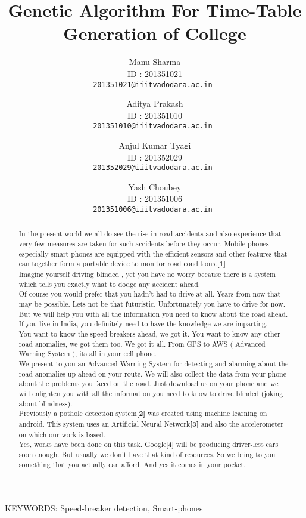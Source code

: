 \documentclass[12pt,twocolumn]{article}
\begin{document}
\title{ Genetic Algorithm For Time-Table Generation of College }

\author{Manu Sharma\\
ID : 201351021\\
{\tt\small 201351021@iiitvadodara.ac.in }
\and
Aditya Prakash\\
ID : 201351010\\
{\tt\small 201351010@iiitvadodara.ac.in }
\and
Anjul Kumar Tyagi\\
ID : 201352029\\
{\tt\small 201352029@iiitvadodara.ac.in }
\and
Yash Choubey\\
ID : 201351006\\
{\tt\small 201351006@iiitvadodara.ac.in }
}
\maketitle
\begin{abstract}
In the present world we all do see the rise in road accidents and also experience that very few measures are taken for such accidents before they occur. Mobile phones especially smart phones are equipped with the efficient sensors and other features that can together form a portable device to monitor road conditions.\textbf{[1]}\\
Imagine yourself driving blinded , yet you have no worry because there is a system which tells you exactly what to dodge any accident ahead.\\
Of course you would prefer that you hadn't had to drive at all. Years from now that may be possible. Lets not be that futuristic. Unfortunately you have to drive for now. But we will help you with all the information you need to know about the road ahead. If you live in India, you definitely need to have the knowledge we are imparting.\\
You want to know the speed breakers ahead, we got it. You want to know any other road anomalies, we got them too. We got it all. From GPS to AWS ( Advanced Warning System ), its all in your cell phone.\\
We present to you an Advanced Warning System for detecting and alarming about the road anomalies up ahead on your route. We will also collect the data from your phone about the problems you faced on the road.
Just download us on your phone and we will enlighten you with all the information you need to know to drive blinded (joking about blindness).\\
Previously a pothole detection system\textbf{[2]} was created using machine learning on android. This system uses an Artificial Neural Network\textbf{[3]} and also the accelerometer on which our work is based.\\
Yes, works have been done on this task. Google[4] will be producing driver-less cars soon enough. But usually we don't have that kind of resources. So we bring to you something that you actually can afford. And yes it comes in your pocket.\\
\end{abstract}
{KEYWORDS}: Speed-breaker detection, Smart-phones\\
\end{document}
